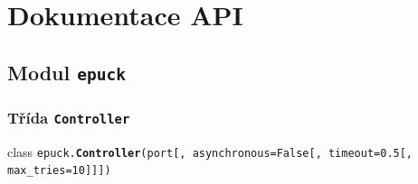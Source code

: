 \documentclass[12pt,notitlepage]{report}
\newcommand{\code}[1]{\texttt{\small #1}}
\begin{document}
\appendix

\chapter{Dokumentace API}%
\label{dokumentace api}

\section{Modul {\tt epuck}}

\subsection{Třída \code{Controller}}
class \code{epuck.{\bf Controller}(port[, asynchronous=False[, timeout=0.5[,\\
        max\_tries=10]]])}
\end{document}
